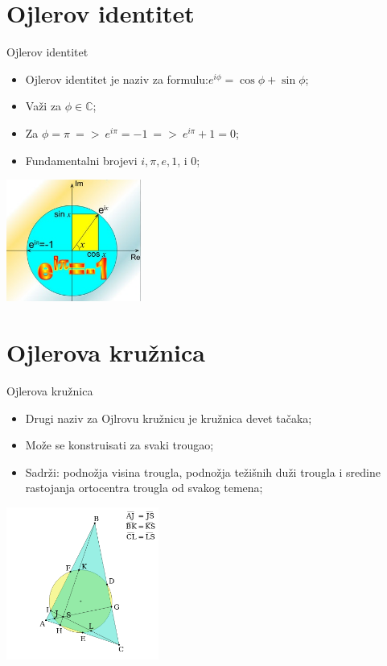 \documentclass[xcolor=dvipsnames]{beamer}
\begin{document}
\section{Ojlerov identitet}
\begin{frame}
\begin{block}{Ojlerov identitet}
    \begin{itemize}
        \item Ojlerov identitet je naziv za formulu:$e^{i\phi}=\cos\phi+\sin\phi$;
        \item Važi za $\phi\in\mathbb{C}$;
        \item Za $\phi=\pi \ => \ e^{i\pi}=-1 \ => \ e^{i\pi}+1=0$;
        \item Fundamentalni brojevi $i, \pi, e, 1$, i $0$;
    \end{itemize}
\end{block}
    \begin{center}
    \includegraphics[height = 4cm]{ojlerova_kruznica1.jpg}
    \end{center}
\end{frame}

\section{Ojlerova kružnica}
\begin{frame}
\begin{block}{Ojlerova kružnica}
    \begin{itemize}
        \item Drugi naziv za Ojlrovu kružnicu je kružnica devet tačaka;
        \item Može se konstruisati za svaki trougao;
        \item Sadrži: podnožja visina trougla, podnožja težišnih duži trougla i sredine rastojanja ortocentra trougla od svakog temena;
    \end{itemize}
\end{block}
    \begin{center}
    \includegraphics[height = 5cm]{ojlerova_kruznica2.png}
    \end{center}
\end{frame}
\end{document}
